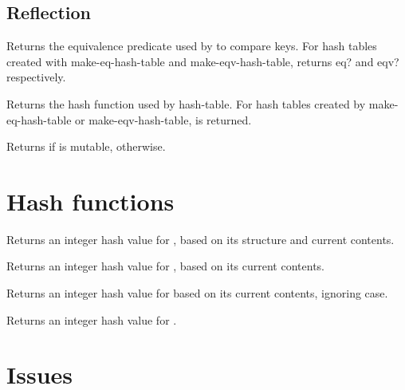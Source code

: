 \documentclass[twoside]{algol60}
\begin{document}
\subsection{Reflection}

\begin{entry}{}
Returns the equivalence predicate used by  to compare keys.  For hash tables created with {\cf make-eq-hash-table} and {\cf make-eqv-hash-table}, returns {\cf eq?} and {\cf eqv?} respectively.
\end{entry}

\begin{entry}{}
Returns the hash function used by hash-table.  For hash tables created by {\cf make-eq-hash-table} or {\cf make-eqv-hash-table}, \schfalse{} is returned.
\end{entry}

\begin{entry}{}
Returns \schtrue{} if  is mutable, \schfalse{} otherwise.
\end{entry}

\section{Hash functions}

\begin{entry}{}
Returns an integer hash value for , based on its structure and current contents.
\end{entry}

\begin{entry}{}
Returns an integer hash value for , based on its current contents.
\end{entry}

\begin{entry}{}
Returns an integer hash value for  based on its current contents, ignoring case.
\end{entry}

\begin{entry}{}
Returns an integer hash value for .
\end{entry}

\section{Issues}
\end{document}

